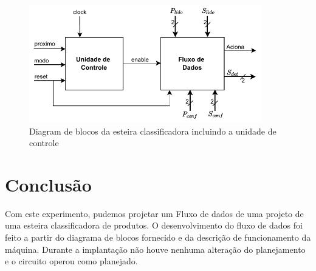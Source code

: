 \documentclass[a4,12pt]{horizon-theme}
\begin{document}
    
\begin{figure}[!ht]
    \centering
    \includegraphics[width=0.9\textwidth]{blocos.pdf}
    \caption{Diagram de blocos da esteira classificadora incluindo a unidade de controle}
    \label{fig:desafio}
\end{figure}
    
\section{Conclusão}
    Com este experimento, pudemos projetar um Fluxo de dados de uma projeto de uma esteira classificadora de produtos. O desenvolvimento do fluxo de dados foi feito a partir do diagrama de blocos fornecido e da descrição de funcionamento da máquina. Durante a implantação não houve nenhuma alteração do planejamento e o circuito operou como planejado.
    
\horizonBackCover
\end{document}
